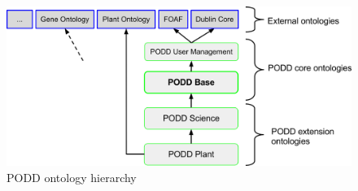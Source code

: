 \documentclass{llncs}
\begin{document}
\begin{figure}
\begin{center}
 \includegraphics[width=12cm,keepaspectratio=true]{podd-ontologies-figure2.png}

\caption{PODD ontology hierarchy}
\label{poddontologies}
\end{center}
\end{figure}




\end{document}
